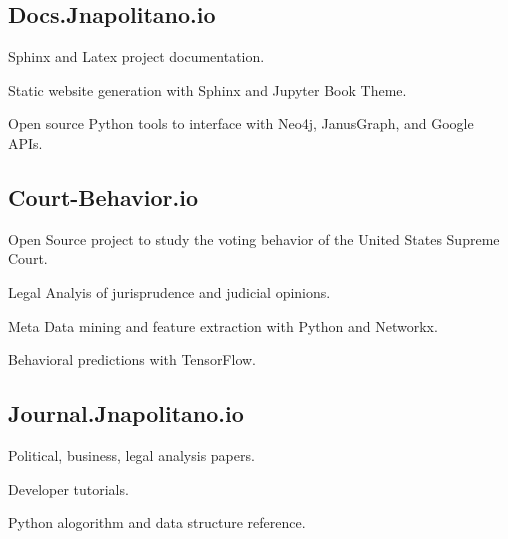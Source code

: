 \documentclass[letter,10pt]{article}
\begin{document}
\subsection{{Docs.Jnapolitano.io}}
\begin{zitemize}
\item Sphinx and Latex project documentation.
\item Static website generation with Sphinx and Jupyter Book Theme.
\item Open source Python tools to interface with Neo4j, JanusGraph, and Google APIs.
\end{zitemize}

\subsection{{Court-Behavior.io}}
\begin{zitemize}
\item Open Source project to study the voting behavior of the United States Supreme Court.  
\item Legal Analyis of jurisprudence and judicial opinions.
\item Meta Data mining and feature extraction with Python and Networkx.
\item Behavioral predictions with TensorFlow.
\end{zitemize}

\subsection{{Journal.Jnapolitano.io}}
\begin{zitemize}
\item Political, business, legal analysis papers.
\item Developer tutorials.
\item Python alogorithm and data structure reference.
\end{zitemize}

\end{document}
